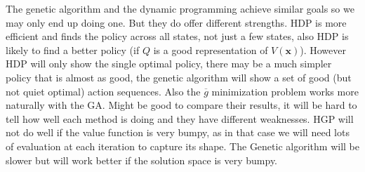 \documentclass[12pt, a4paper]{article}
\begin{document}
The genetic algorithm and the dynamic programming achieve similar goals so we may only end up doing one. But they do offer different strengths. HDP is more efficient and finds the policy across all states, not just a few states, also HDP is likely to find a better policy (if $Q$ is a good representation of $V(\mathbf{x})$). However HDP will only show the single optimal policy, there may be a much simpler policy that is almost as good, the genetic algorithm will show a set of good (but not quiet optimal) action sequences. Also the $\overline{g}$ minimization problem works more naturally with the GA. Might be good to compare their results, it will be hard to tell how well each method is doing and they have different weaknesses. HGP will not do well if the value function is very bumpy, as in that case we will need lots of evaluation at each iteration to capture its shape. The Genetic algorithm will be slower but will work better if the solution space is very bumpy.       

 

\end{document}
